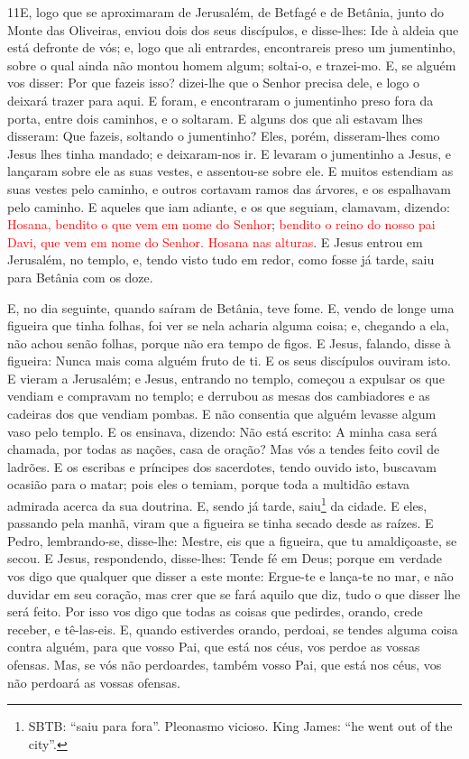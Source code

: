 \medskip

\lettrine{11} E, logo que se aproximaram de Jerusalém, de
Betfagé e de Betânia, junto do Monte das Oliveiras, enviou dois dos
seus discípulos, e disse-lhes: Ide à aldeia que está defronte de
vós; e, logo que ali entrardes, encontrareis preso um jumentinho,
sobre o qual ainda não montou homem algum; soltai-o, e trazei-mo.
E, se alguém vos disser: Por que fazeis isso? dizei-lhe que o
Senhor precisa dele, e logo o deixará trazer para aqui. E foram,
e encontraram o jumentinho preso fora da porta, entre dois caminhos,
e o soltaram. E alguns dos que ali estavam lhes disseram: Que
fazeis, soltando o jumentinho? Eles, porém, disseram-lhes como
Jesus lhes tinha mandado; e deixaram-nos ir. E levaram o
jumentinho a Jesus, e lançaram sobre ele as suas vestes, e
assentou-se sobre ele. E muitos estendiam as suas vestes pelo
caminho, e outros cortavam ramos das árvores, e os espalhavam pelo
caminho. E aqueles que iam adiante, e os que seguiam, clamavam,
dizendo: \textcolor{red}{Hosana, bendito o que vem em nome do Senhor};
\textcolor{red}{bendito o reino do nosso pai Davi, que vem em nome do
Senhor. Hosana nas alturas}. E Jesus entrou em Jerusalém, no
templo, e, tendo visto tudo em redor, como fosse já tarde, saiu para
Betânia com os doze.

E, no dia seguinte, quando saíram de Betânia, teve fome.
E, vendo de longe uma figueira que tinha folhas, foi ver se
nela acharia alguma coisa; e, chegando a ela, não achou senão
folhas, porque não era tempo de figos. E Jesus, falando,
disse à figueira: Nunca mais coma alguém fruto de ti. E os seus
discípulos ouviram isto. E vieram a Jerusalém; e Jesus,
entrando no templo, começou a expulsar os que vendiam e compravam no
templo; e derrubou as mesas dos cambiadores e as cadeiras dos que
vendiam pombas. E não consentia que alguém levasse algum vaso
pelo templo. E os ensinava, dizendo: Não está escrito: A
minha casa será chamada, por todas as nações, casa de oração? Mas
vós a tendes feito covil de ladrões. E os escribas e
príncipes dos sacerdotes, tendo ouvido isto, buscavam ocasião para o
matar; pois eles o temiam, porque toda a multidão estava admirada
acerca da sua doutrina. E, sendo já tarde,
saiu\footnote{SBTB: ``saiu para fora''. Pleonasmo vicioso. King
James: ``he went out of the city''.} da cidade. E eles,
passando pela manhã, viram que a figueira se tinha secado desde as
raízes. E Pedro, lembrando-se, disse-lhe: Mestre, eis que a
figueira, que tu amaldiçoaste, se secou. E Jesus,
respondendo, disse-lhes: Tende fé em Deus; porque em verdade
vos digo que qualquer que disser a este monte: Ergue-te e lança-te
no mar, e não duvidar em seu coração, mas crer que se fará aquilo
que diz, tudo o que disser lhe será feito. Por isso vos digo
que todas as coisas que pedirdes, orando, crede receber, e
tê-las-eis. E, quando estiverdes orando, perdoai, se tendes
alguma coisa contra alguém, para que vosso Pai, que está nos céus,
vos perdoe as vossas ofensas. Mas, se vós não perdoardes,
também vosso Pai, que está nos céus, vos não perdoará as vossas
ofensas.

